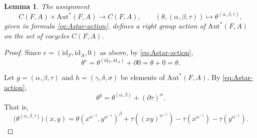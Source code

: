 \documentclass[12pt,a4paper]{amsart}
\newtheorem{lemma}[theorem]{Lemma}
\theoremstyle{definition}
\begin{document}
\begin{lemma} \label{lem:affine-action-on-cocycles}
The assignment
\[
C(F,A)\times\mathrm{Aut}^{\!*}(F,A)\to C(F,A),\qquad
(\theta, (\alpha,\beta,\tau))\mapsto\theta^{(\alpha,\beta,\tau)},
\]
given in formula \eqref{eq:Astar-action}, defines a right group action of
$\mathrm{Aut}^{\!*}(F,A)$ on the set of cocycles $C(F,A)$.
\end{lemma}
\begin{proof}
Since $e=(\mathrm{id}_F,\mathrm{id}_A,0)$ as above, by \eqref{eq:Astar-action},
\[
\theta^{e}
=
\theta^{(\mathrm{id}_F,\mathrm{id}_A)}+\partial 0
=
\theta+0
=
\theta.
\]

Let $g=(\alpha,\beta,\tau)$ and $h=(\gamma,\delta,\sigma)$ be elements of $\mathrm{Aut}^{\!*}(F,A)$. 
By \eqref{eq:Astar-action}, 
\[
\theta^{g}
=\theta^{(\alpha,\beta)} + (\partial{\tau})^{\alpha}.
\]
That is,
\[
\bigl(\theta^{(\alpha,\beta,\tau)}\bigr)(x,y)
=
\theta(x^{\alpha^{-1}},y^{\alpha^{-1}})^{\beta}
+
\tau((xy)^{\alpha^{-1}})
-\tau(x^{\alpha^{-1}})
-\tau(y^{\alpha^{-1}}).
\]


\end{proof}
\end{document}

